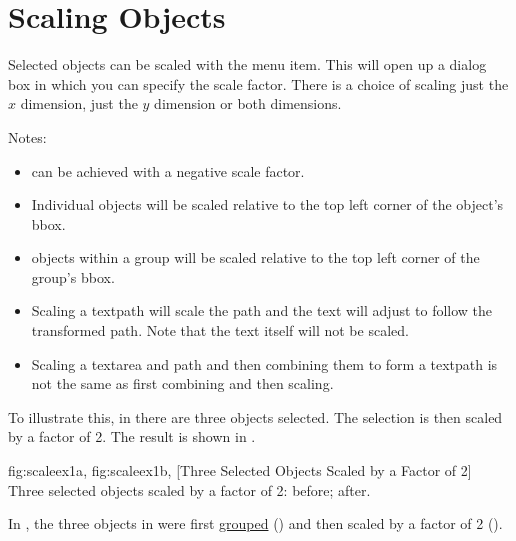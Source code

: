 

\section{Scaling Objects}\label{sec:scaleobjects}


Selected \glspl{object} can be scaled with the
 menu item. This will open up a dialog box
in which you can specify the scale factor. There is a choice of
scaling just the $x$ dimension, just the $y$ dimension
or both dimensions.

Notes:
\begin{itemize}
\item {} can be
achieved with a negative scale factor.

\item Individual \glspl*{object} will be
scaled relative to the top left corner of the
object's \gls{bbox}.

\item \Glspl*{object} within a
\gls{group} will be scaled relative to the top left corner
of the group's \gls*{bbox}.

\item Scaling a \gls{textpath} will scale the path and the text
will adjust to follow the transformed path. Note that the text
itself will not be scaled.

\item Scaling a \gls*{textarea} and \gls*{path} and then combining
them to form a \gls*{textpath} is not the same as first combining
and then scaling.
\end{itemize}

To illustrate this, in  there are three
\glspl*{object} selected.
The selection is then scaled by a factor of 2.
The result is shown in .

{
 {fig:scaleex1a}{}{},
 {fig:scaleex1b}{}{},
}
[Three Selected Objects Scaled by a Factor of 2]
{Three selected objects scaled by a factor of 2:
 before;
 after.}

In , the three objects in
 were first
\hyperref[sec:grouping]{grouped} ()
and then scaled by a factor of 2 ().

